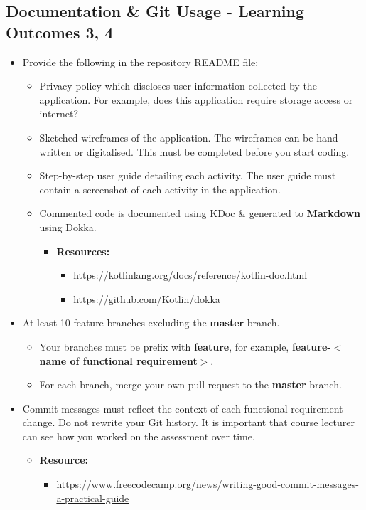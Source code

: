 \documentclass{article}
\begin{document}
\subsection*{Documentation \& Git Usage - Learning Outcomes 3, 4}
\begin{itemize}
	\item Provide the following in the repository README file:
	      \begin{itemize}
	      	\item Privacy policy which discloses user information collected by the application. For example, does this application require storage access or internet? 
	      	\item Sketched wireframes of the application. The wireframes can be hand-written or digitalised. This must be completed before you start coding.
	      	\item Step-by-step user guide detailing each activity. The user guide must contain a screenshot of each activity in the application.
	      	\item Commented code is documented using KDoc \& generated to \textbf{Markdown} using Dokka.
	      	      \begin{itemize}
	      	      	\item \textbf{Resources:}
	      	      	      \begin{itemize}
	      	      	      	\item \footnotesize\href{https://kotlinlang.org/docs/reference/kotlin-doc.html}{https://kotlinlang.org/docs/reference/kotlin-doc.html}
	      	      	      	\item \footnotesize\href{https://github.com/Kotlin/dokka}{https://github.com/Kotlin/dokka}
	      	      	      \end{itemize}
	      	      \end{itemize} 
	      \end{itemize}
	\item At least 10 feature branches excluding the \textbf{master} branch.
	      \begin{itemize}
	      	\item Your branches must be prefix with \textbf{feature}, for example, \textbf{feature-$<$name of functional requirement$>$}.
	      	\item For each branch, merge your own pull request to the \textbf{master} branch.
	      \end{itemize}
	\item Commit messages must reflect the context of each functional requirement change. Do not rewrite your Git history. It is important that course lecturer can see how you worked on the assessment over time.
	      \begin{itemize}
	      	\item \textbf{Resource:} 
	      	      \begin{itemize}
	      	      	\item \footnotesize\href{https://www.freecodecamp.org/news/writing-good-commit-messages-a-practical-guide}{https://www.freecodecamp.org/news/writing-good-commit-messages-a-practical-guide}
	      	      \end{itemize}
	      \end{itemize}
\end{itemize}
\end{document}
